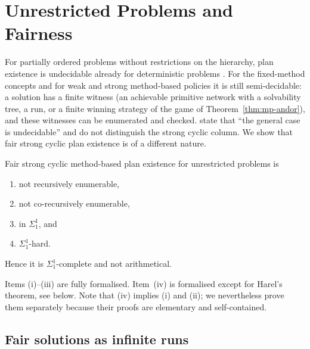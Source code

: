 \section{Unrestricted Problems and Fairness}\label{sec:unrestricted}

For partially ordered problems without restrictions on the hierarchy, plan existence is
undecidable already for deterministic problems \parencite{erol:et:al:amai-96}. For the fixed-method
concepts and for weak and strong method-based policies it is still semi-decidable: a solution has a
finite witness (an achievable primitive network with a solvability tree, a run, or a finite winning
strategy of the game of Theorem~\ref{thm:mp-andor}), and these witnesses can be enumerated and
checked. \CBb{} state that ``the general case is undecidable'' and do not distinguish the strong
cyclic column. We show that fair strong cyclic plan existence is of a different nature.

\begin{theorem}\label{thm:sigma11}
  Fair strong cyclic method-based plan existence for unrestricted problems is
  \begin{enumerate}[label=(\roman*)]
    \item not recursively enumerable,
    \item not co-recursively enumerable,
    \item in $\Sigma^1_1$, and
    \item $\Sigma^1_1$-hard.
  \end{enumerate}
  Hence it is $\Sigma^1_1$-complete and not arithmetical.
\end{theorem}

Items (i)--(iii) are fully formalised. Item~(iv) is formalised except for Harel's theorem, see
below. Note that (iv) implies (i) and (ii); we nevertheless prove them separately because
their proofs are elementary and self-contained.

\subsection{Fair solutions as infinite runs}

